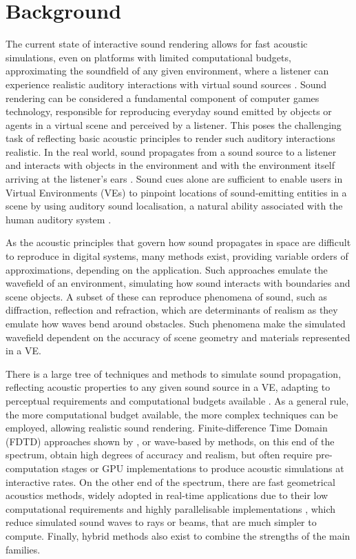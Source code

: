 \chapter{Background}\label{ch:Background}

The current state of interactive sound rendering allows for fast acoustic simulations, even on platforms with limited computational budgets, approximating the soundfield of any given environment, where a listener can experience realistic auditory interactions with virtual sound sources \citep{lakka2018spatial, hulusic2012acoustic}. Sound rendering can be considered a fundamental component of computer games technology, responsible for reproducing everyday sound emitted by objects or agents in a virtual scene and perceived by a listener. This poses the challenging task of reflecting basic acoustic principles to render such auditory interactions realistic. In the real world, sound propagates from a sound source to a listener and interacts with objects in the environment and with the environment itself arriving at the listener's ears \citep{kuttruff2016room}. Sound cues alone are sufficient to enable users in Virtual Environments (VEs) to pinpoint locations of sound-emitting entities in a scene by using auditory sound localisation, a natural ability associated with the human auditory system \citep{lokki2005navigation, rubio2017immersive}. \par
As the acoustic principles that govern how sound propagates in space are difficult to reproduce in digital systems, many methods exist, providing variable orders of approximations, depending on the application. Such approaches emulate the wavefield of an environment, simulating how sound interacts with boundaries and scene objects. A subset of these can reproduce phenomena of sound, such as diffraction, reflection and refraction, which are determinants of realism as they emulate how waves bend around obstacles. Such phenomena make the simulated wavefield dependent on the accuracy of scene geometry and materials represented in a VE. \par
There is a large tree of techniques and methods to simulate sound propagation, reflecting acoustic properties to any given sound source in a VE, adapting to perceptual requirements and computational budgets available \cite{doukakis2019audio}. As a general rule, the more computational budget available, the more complex techniques can be employed, allowing realistic sound rendering. Finite-difference Time Domain (FDTD) approaches shown by \cite{hamilton2017fdtd}, or wave-based by \cite{raghuvanshi2014parametric} methods, on this end of the spectrum, obtain high degrees of accuracy and realism, but often require pre-computation stages or GPU implementations to produce acoustic simulations at interactive rates. On the other end of the spectrum, there are fast geometrical acoustics methods, widely adopted in real-time applications due to their low computational requirements and highly parallelisable implementations \citep{cowan2010gpu}, which reduce simulated sound waves to rays or beams, that are much simpler to compute. Finally, hybrid methods also exist to combine the strengths of the main families. \par
